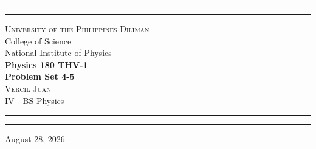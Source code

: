 \begin{titlepage}
    \vspace*{2.5in}
    \hrule
    \vspace{3pt}
    \hrule
    \vspace{0.25in}
    \begin{center}
		{
			\Large 
			\textsc{
				University of the Philippines Diliman
			}
			\\[4pt]
			College of Science
			\\[4pt]
			National Institute of Physics
		}
		\\[0.5cm]
		{
			\Huge
			\textbf{
				Physics 180 THV-1
				\\[5pt]
				Problem Set 4-5
			}
		}
		\\[0.75cm]
		{
			\Large 
			\textsc{
				Vercil Juan
			}
		}\\[5pt] 
		{
			\large 
			IV - BS Physics
		}
    \end{center}
    \vspace{0.25in}
    \hrule
    \vspace{3pt}
    \hrule 
    \vfill
    \begin{center}
    {\large 
		August 28, 2026
	}
    \end{center}
\end{titlepage}

